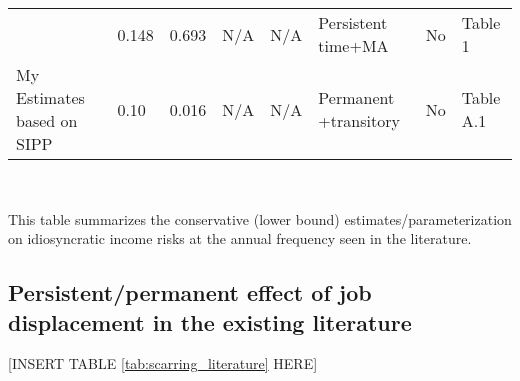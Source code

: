 \begin{sidewaystable}[p]
\begin{adjustbox}{width={\textwidth}}
\begin{threeparttable}
\begin{tabular}{llllllll}
\cite{bayer2019precautionary}    & 0.148          & 0.693           & N/A           & N/A          & Persistent time+MA      & No           & Table 1   \\
My Estimates based on SIPP       & 0.10           & 0.016           & N/A           & N/A          & Permanent +transitory   & No           & Table A.1
\end{tabular} \\
\hline 
	\begin{flushleft}
\item This table summarizes the  conservative (lower bound) estimates/parameterization on idiosyncratic income risks at the annual frequency seen in the literature.    \end{flushleft}
\end{threeparttable}
\end{adjustbox}
	\end{sidewaystable}
	
	
	

\subsection{Persistent/permanent effect of job displacement in the existing literature}

\begin{center}
[INSERT TABLE \ref{tab:scarring_literature} HERE]  
\end{center}

